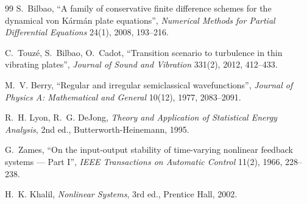 \documentclass[11pt,a4paper]{article}
\begin{document}
\begin{thebibliography}{99}
 S.~Bilbao, ``A family of conservative finite
  difference schemes for the dynamical von K\'arm\'an plate equations'',
  \emph{Numerical Methods for Partial Differential Equations} 24(1),
  2008, 193--216.

 C.~Touz\'e, S.~Bilbao, O.~Cadot, ``Transition
  scenario to turbulence in thin vibrating plates'', \emph{Journal of
  Sound and Vibration} 331(2), 2012, 412--433.

 M.~V. Berry, ``Regular and irregular semiclassical
  wavefunctions'', \emph{Journal of Physics A: Mathematical and General}
  10(12), 1977, 2083--2091.

 R.~H. Lyon, R.~G. DeJong, \emph{Theory and Application of
  Statistical Energy Analysis}, 2nd ed., Butterworth-Heinemann, 1995.

 G.~Zames, ``On the input-output stability of time-varying
  nonlinear feedback systems --- Part I'', \emph{IEEE Transactions on
  Automatic Control} 11(2), 1966, 228--238.

 H.~K. Khalil, \emph{Nonlinear Systems}, 3rd ed.,
  Prentice Hall, 2002.

\end{thebibliography}
\end{document}
